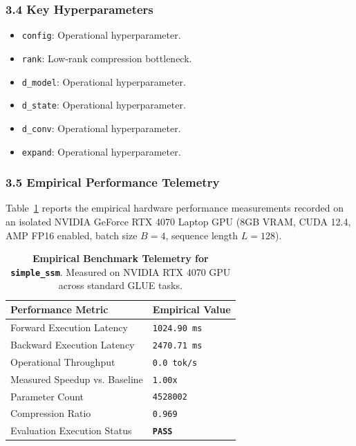 \subsubsection*{3.4 Key Hyperparameters}
\begin{itemize}
    \item \texttt{config}: Operational hyperparameter.
    \item \texttt{rank}: Low-rank compression bottleneck.
    \item \texttt{d\_model}: Operational hyperparameter.
    \item \texttt{d\_state}: Operational hyperparameter.
    \item \texttt{d\_conv}: Operational hyperparameter.
    \item \texttt{expand}: Operational hyperparameter.
\end{itemize}

\subsubsection*{3.5 Empirical Performance Telemetry}
Table~\ref{tab:telemetry_simple\_ssm} reports the empirical hardware performance measurements recorded on an isolated NVIDIA GeForce RTX 4070 Laptop GPU (8GB VRAM, CUDA 12.4, AMP FP16 enabled, batch size $B=4$, sequence length $L=128$).

\begin{table}[h]
\centering
\small
\caption{\textbf{Empirical Benchmark Telemetry for \texttt{simple\_ssm}}. Measured on NVIDIA RTX 4070 GPU across standard GLUE tasks.}
\label{tab:telemetry_simple\_ssm}
\begin{tabularx}{\columnwidth}{lX}
\toprule
\textbf{Performance Metric} & \textbf{Empirical Value} \\
\midrule
Forward Execution Latency & \texttt{1024.90 ms} \\
Backward Execution Latency & \texttt{2470.71 ms} \\
Operational Throughput & \texttt{0.0 tok/s} \\
Measured Speedup vs. Baseline & \texttt{1.00x} \\
Parameter Count & \texttt{4528002} \\
Compression Ratio & \texttt{0.969} \\
Evaluation Execution Status & \textbf{\texttt{PASS}} \\
\bottomrule
\end{tabularx}
\end{table}


